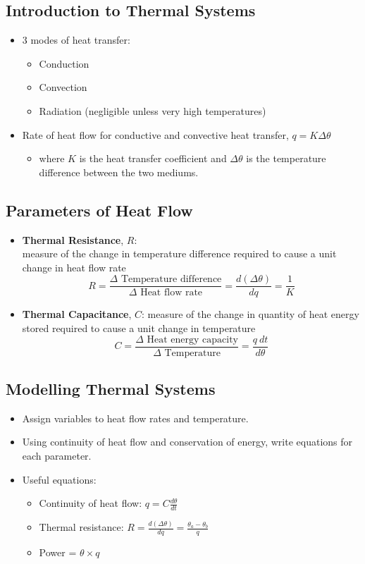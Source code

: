 \documentclass[a4paper]{article}
\begin{document}
\subsection{Introduction to Thermal Systems}
\begin{itemize}
    \item 3 modes of heat transfer:
    \begin{itemize}[label=$\circ$]
        \item Conduction
        \item Convection
        \item Radiation (negligible unless very high temperatures)
    \end{itemize}
    \item Rate of heat flow for conductive and convective heat transfer, $q = K\Delta\theta$
    \begin{itemize}[label=$\circ$]
        \item where $K$ is the heat transfer coefficient and $\Delta\theta$ is the temperature difference between the two mediums.
    \end{itemize}
\end{itemize}

\subsection{Parameters of Heat Flow}
\begin{itemize}
    \item \textbf{Thermal Resistance}, $R$: \\measure of the change in temperature difference required to cause a unit change in heat flow rate
    $$R = \frac{\Delta\text{ Temperature difference}}{\Delta\text{ Heat flow rate}} = \frac{d(\Delta\theta)}{dq} = \frac{1}{K}$$
    \item \textbf{Thermal Capacitance}, $C$: measure of the change in quantity of heat energy stored required to cause a unit change in temperature
    $$C = \frac{\Delta\text{ Heat energy capacity}}{\Delta\text{ Temperature}} = \frac{q\ dt}{d\theta}$$
\end{itemize}

\subsection{Modelling Thermal Systems}
\begin{itemize}
    \item Assign variables to heat flow rates and temperature.
    \item Using continuity of heat flow and conservation of energy, write equations for each parameter.
    \item Useful equations:
    \begin{itemize}
        \item Continuity of heat flow: $q = \displaystyle C\frac{d\theta}{dt}$
        \item Thermal resistance: $R = \displaystyle\frac{d(\Delta\theta)}{dq} = \frac{\theta_a-\theta_b}{q}$
        \item Power = $\theta\times q$
    \end{itemize}
\end{itemize}
\end{document}
